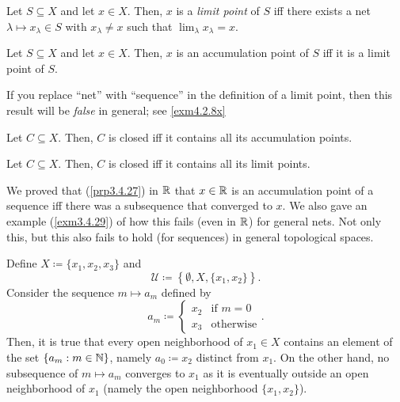 \begin{dfn}
Let $S\subseteq X$ and let $x\in X$.  Then, $x$ is a \emph{limit point} of $S$ iff there exists a net $\lambda \mapsto x_\lambda \in S$ with $x_\lambda \neq x$ such that $\lim _\lambda x_\lambda =x$.
\end{dfn}
\begin{prp}
Let $S\subseteq X$ and let $x\in X$.  Then, $x$ is an accumulation point of $S$ iff it is a limit point of $S$.
\begin{rmk}
If you replace ``net'' with ``sequence'' in the definition of a limit point, then this result will be \emph{false} in general; see \cref{exm4.2.8x}
\end{rmk}
\end{prp}
\begin{prp}
Let $C\subseteq X$.  Then, $C$ is closed iff it contains all its accumulation points.
\end{prp}
\begin{crl}
Let $C\subseteq X$.  Then, $C$ is closed iff it contains all its limit points.
\end{crl}
We proved that (\cref{prp3.4.27}) in $\mathbb{R}$ that $x\in \mathbb{R}$ is an accumulation point of a sequence iff there was a subsequence that converged to $x$.  We also gave an example (\cref{exm3.4.29}) of how this fails (even in $\mathbb{R}$) for general nets.  Not only this, but this also fails to hold (for sequences) in general topological spaces.
\begin{exm}\label{exm4.2.15}
Define $X\coloneqq \{ x_1,x_2,x_3\}$ and
\begin{equation}
\mathcal{U}\coloneqq \left\{ \emptyset ,X,\{ x_1,x_2\} \right\} .
\end{equation}
Consider the sequence $m\mapsto a_m$ defined by
\begin{equation}
a_m\coloneqq \begin{cases}x_2 & \text{if }m=0 \\ x_3 & \text{otherwise}\end{cases}.
\end{equation}
Then, it is true that every open neighborhood of $x_1\in X$ contains an element of the set $\{ a_m:m\in \mathbb{N} \}$, namely $a_0\coloneqq x_2$ distinct from $x_1$.  On the other hand, no subsequence of $m\mapsto a_m$ converges to $x_1$ as it is eventually outside an open neighborhood of $x_1$ (namely the open neighborhood $\{ x_1,x_2\}$).
\end{exm}
